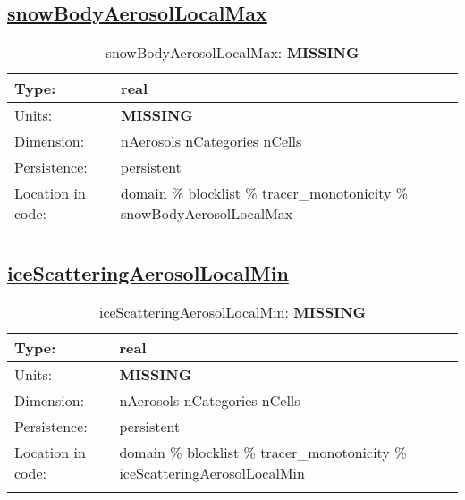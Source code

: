 \subsection[snowBodyAerosolLocalMax]{\hyperref[sec:var_tab_tracer_monotonicity]{snowBodyAerosolLocalMax}}
\label{subsec:var_sec_tracer_monotonicity_snowBodyAerosolLocalMax}
\begin{center}
\begin{longtable}{| p{2.0in} | p{4.0in} |}
        \hline 
        Type: & real \\
        \hline 
        Units: & {\bf \color{red} MISSING} \\
        \hline 
        Dimension: & nAerosols nCategories nCells \\
        \hline 
        Persistence: & persistent \\
        \hline 
         Location in code: & domain \% blocklist \% tracer\_monotonicity \% snowBodyAerosolLocalMax \\
         \hline 
    \caption{snowBodyAerosolLocalMax: {\bf \color{red} MISSING}}
\end{longtable}
\end{center}
\subsection[iceScatteringAerosolLocalMin]{\hyperref[sec:var_tab_tracer_monotonicity]{iceScatteringAerosolLocalMin}}
\label{subsec:var_sec_tracer_monotonicity_iceScatteringAerosolLocalMin}
\begin{center}
\begin{longtable}{| p{2.0in} | p{4.0in} |}
        \hline 
        Type: & real \\
        \hline 
        Units: & {\bf \color{red} MISSING} \\
        \hline 
        Dimension: & nAerosols nCategories nCells \\
        \hline 
        Persistence: & persistent \\
        \hline 
         Location in code: & domain \% blocklist \% tracer\_monotonicity \% iceScatteringAerosolLocalMin \\
         \hline 
    \caption{iceScatteringAerosolLocalMin: {\bf \color{red} MISSING}}
\end{longtable}
\end{center}

